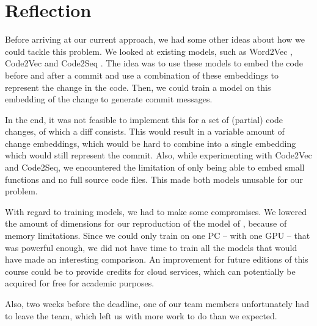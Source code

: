 \section{Reflection}
Before arriving at our current approach, we had some other ideas about how we could tackle this problem. We looked at existing models,  such as Word2Vec \cite{mikolov2013efficient}, Code2Vec \cite{alon2018code2vec} and Code2Seq \cite{alon2018code2seq}. The idea was to use these models to embed the code before and after a commit and use a combination of these embeddings to represent the change in the code. Then, we could train a model on this embedding of the change to generate commit messages. 

In the end, it was not feasible to implement this for a set of (partial) code changes, of which a diff consists. This would result in a variable amount of change embeddings, which would be hard to combine into a single embedding which would still represent the commit. Also, while experimenting with Code2Vec and Code2Seq, we encountered the limitation of only being able to embed small functions and no full source code files. This made both models unusable for our problem.

With regard to training models, we had to make some compromises. We lowered the amount of dimensions for our reproduction of the model of \citeauthor{jiang_automatically_2017} \cite{jiang_automatically_2017}, because of memory limitations. Since we could only train on one PC -- with one GPU -- that was powerful enough, we did not have time to train all the models that would have made an interesting comparison. An improvement for future editions of this course could be to provide credits for cloud services, which can potentially be acquired for free for academic purposes.

Also, two weeks before the deadline, one of our team members unfortunately had to leave the team, which left us with more work to do than we expected.
